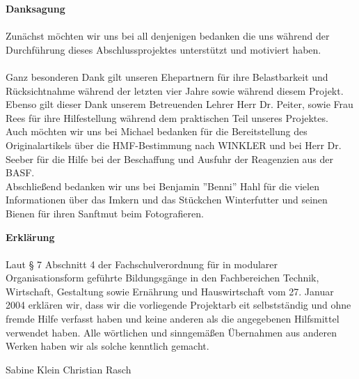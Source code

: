 \documentclass[%
11pt,                               %
liststotoc,                 %
bibtotoc,                       %
]{scrreprt}
\begin{document}







\newpage
\textbf{Danksagung}\\
\\
Zunächst möchten wir uns bei all denjenigen bedanken die uns während der Durchführung dieses Abschlussprojektes unterstützt und motiviert haben. \\
\\
Ganz besonderen Dank gilt unseren Ehepartnern für ihre Belastbarkeit und Rücksichtnahme während der letzten vier Jahre sowie während diesem Projekt.\\
Ebenso gilt dieser Dank unserem Betreuenden Lehrer Herr Dr. Peiter, sowie Frau Rees für ihre Hilfestellung während dem praktischen Teil unseres Projektes.\\
Auch möchten wir uns bei Michael bedanken für die Bereitstellung des Originalartikels über die HMF-Bestimmung nach WINKLER und bei Herr Dr. Seeber für die Hilfe bei der Beschaffung und Ausfuhr der Reagenzien aus der BASF.\\
Abschließend bedanken wir uns bei Benjamin ''Benni'' Hahl für die vielen Informationen über das Imkern und das Stückchen Winterfutter und seinen Bienen für ihren Sanftmut beim Fotografieren.


\listoffigures
\listoftables
\listofdiagrams





\newpage


\vspace*{2cm}
\textbf{Erklärung} \\
\\
Laut §  7  Abschnitt  4  der  Fachschulverordnung für  in  modularer Organisationsform geführte 
Bildungsgänge in den Fachbereichen Technik, Wirtschaft, Gestaltung sowie Ernährung und 
Hauswirtschaft  vom  27.  Januar  2004  erklären  wir,  dass  wir  die  vorliegende  Projektarb
eit 
selbstständig und ohne fremde Hilfe verfasst haben und keine anderen als die angegebenen 
Hilfsmittel  verwendet  haben.  Alle  wörtlichen  und  sinngemäßen  Übernahmen  aus  anderen 
Werken haben wir als solche kenntlich gemacht. 

\vspace*{50pt}Sabine Klein Christian Rasch
\end{document}
